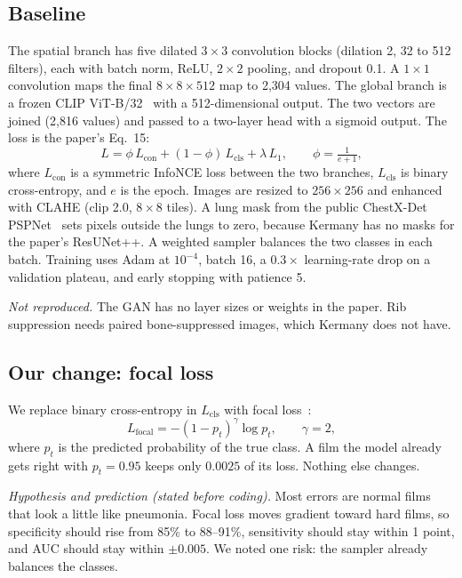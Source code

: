 \documentclass[conference]{IEEEtran}
\begin{document}
\subsection{Baseline}
The spatial branch has five dilated $3\times3$ convolution blocks (dilation 2, 32 to 512 filters), each with batch norm, ReLU, $2\times2$ pooling, and dropout 0.1. A $1\times1$ convolution maps the final $8\times8\times512$ map to 2{,}304 values. The global branch is a frozen CLIP ViT-B/32~\cite{radford2021} with a 512-dimensional output. The two vectors are joined (2{,}816 values) and passed to a two-layer head with a sigmoid output. The loss is the paper's Eq.~15:
\begin{equation}
L = \phi\,L_{\text{con}} + (1-\phi)\,L_{\text{cls}} + \lambda\,L_{1},\qquad \phi = \tfrac{1}{e+1},
\end{equation}
where $L_{\text{con}}$ is a symmetric InfoNCE loss between the two branches, $L_{\text{cls}}$ is binary cross-entropy, and $e$ is the epoch. Images are resized to $256\times256$ and enhanced with CLAHE (clip 2.0, $8\times8$ tiles). A lung mask from the public ChestX-Det PSPNet~\cite{cohen2022} sets pixels outside the lungs to zero, because Kermany has no masks for the paper's ResUNet++. A weighted sampler balances the two classes in each batch. Training uses Adam at $10^{-4}$, batch 16, a $0.3\times$ learning-rate drop on a validation plateau, and early stopping with patience 5.

\textit{Not reproduced.} The GAN has no layer sizes or weights in the paper. Rib suppression needs paired bone-suppressed images, which Kermany does not have.

\subsection{Our change: focal loss}
We replace binary cross-entropy in $L_{\text{cls}}$ with focal loss~\cite{lin2017}:
\begin{equation}
L_{\text{focal}} = -(1-p_t)^{\gamma}\log p_t,\qquad \gamma = 2,
\end{equation}
where $p_t$ is the predicted probability of the true class. A film the model already gets right with $p_t = 0.95$ keeps only $0.0025$ of its loss. Nothing else changes.

\textit{Hypothesis and prediction (stated before coding).} Most errors are normal films that look a little like pneumonia. Focal loss moves gradient toward hard films, so specificity should rise from 85\% to 88--91\%, sensitivity should stay within 1 point, and AUC should stay within $\pm0.005$. We noted one risk: the sampler already balances the classes.
\end{document}
